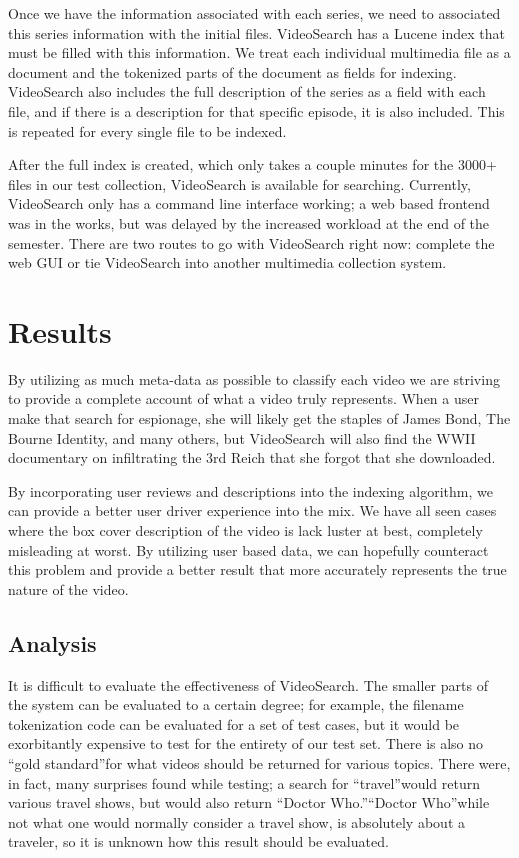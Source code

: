 \documentclass{acm_proc_article-sp}
\begin{document}
Once we have the information associated with each series, we need to associated this series information with the initial files.  VideoSearch has a Lucene index that must be filled with this information.  We treat each individual multimedia file as a document and the tokenized parts of the document as fields for indexing.  VideoSearch also includes the full description of the series as a field with each file, and if there is a description for that specific episode, it is also included.  This is repeated for every single file to be indexed.

After the full index is created, which only takes a couple minutes for the 3000+ files in our test collection, VideoSearch is available for searching.  Currently, VideoSearch only has a command line interface working; a web based frontend was in the works, but was delayed by the increased workload at the end of the semester.  There are two routes to go with VideoSearch right now: complete the web GUI or tie VideoSearch into another multimedia collection system.


\section{Results}
    By utilizing as much meta-data as possible to classify each video we are striving to provide a complete account of what a video truly represents. When a user make that search for espionage, she will likely get the staples of James Bond, The Bourne Identity, and many others, but VideoSearch will also find the WWII documentary on infiltrating the 3rd Reich that she forgot that she downloaded.

    By incorporating user reviews and descriptions into the indexing algorithm, we can provide a better user driver experience into the mix. We have all seen cases where the box cover description of the video is lack luster at best, completely misleading at worst. By utilizing user based data, we can hopefully counteract this problem and provide a better result that more accurately represents the true nature of the video.

   


\subsection{Analysis}

It is difficult to evaluate the effectiveness of VideoSearch. The smaller parts of the system can be evaluated to a certain degree; for example, the filename tokenization code can be evaluated for a set of test cases, but it would be exorbitantly expensive to test for the entirety of our test set.  There is also no \textquotedblleft gold standard\textquotedblright for what videos should be returned for various topics.  There were, in fact, many surprises found while testing; a search for \textquotedblleft travel\textquotedblright would return various travel shows, but would also return \textquotedblleft Doctor Who.\textquotedblright  \textquotedblleft Doctor Who\textquotedblright while not what one would normally consider a travel show, is absolutely about a traveler, so it is unknown how this result should be evaluated.
\end{document}
